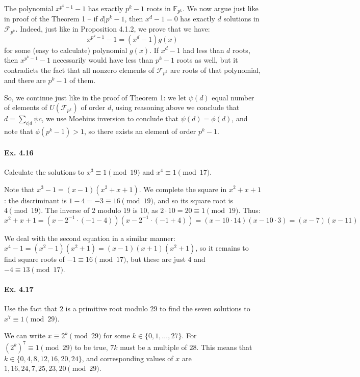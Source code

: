 \documentclass[notitlepage]{article}
\theoremstyle{definition}
\newcommand\F{\mathcal{F}}
\begin{document}
The polynomial $x^{p^k - 1} - 1$ has exactly $p^k - 1$ roots in
$\mathbb{F}_{p^k}$. We now argue just like in proof of the Theorem 1
-- if $d|p^k - 1$, then $x^d - 1 = 0$ has exactly $d$ solutions in
$\F_{p^k}$. Indeed, just like in Proposition 4.1.2, we prove that we
have:
\begin{equation}
  x^{p^k - 1} - 1 = (x^d - 1)g(x)
\end{equation}
for some (easy to calculate) polynomial $g(x)$. If $x^d - 1$ had less
than $d$ roots, then $x^{p^k - 1} - 1$ necessarily would have less
than $p^k - 1$ roots as well, but it contradicts the fact that all
nonzero elements of $\F_{p^k}$ are roots of that polynomial, and there
are $p^k - 1$ of them.

So, we continue just like in the proof of Theorem 1: we let $\psi(d)$
equal number of elements of $U(\F_{p^k})$ of order $d$, using
reasoning above we conclude that $d = \sum_{c|d} \psi{c}$, we use
Moebius inversion to conclude that $\psi(d) = \phi(d)$, and note that
$\phi(p^k - 1) > 1$, so there exists an element of order $p^k - 1$.

\paragraph{Ex. 4.16}
Calculate the solutions to $x^3 \equiv 1 \pmod {19}$ and $x^4 \equiv 1
\pmod {17}$.

Note that $x^3 - 1 = (x-1)(x^2 + x + 1)$. We complete the square in
$x^2 + x + 1$: the discriminant is $1 - 4 = -3 \equiv 16 \pmod {19}$,
and so its square root is $4 \pmod {19}$. The inverse of $2$ modulo
$19$ is $10$, as $2 \cdot 10 = 20 \equiv 1 \pmod {19}$. Thus:
\begin{equation}
x^2 + x + 1 = (x - 2^{-1}\cdot(-1 - 4))(x-2^{-1}\cdot(-1+4)) = (x-10 \cdot
14)(x-10 \cdot 3) = (x - 7)(x - 11)
\end{equation}

We deal with the second equation in a similar manner: $x^4 - 1 = (x^2
- 1)(x^2 + 1) = (x-1)(x+1)(x^2+1)$, so it remains to find square roots
of $-1 \equiv 16 \pmod {17}$, but these are just $4$ and $-4 \equiv 13
\pmod {17}$.

\paragraph{Ex. 4.17}
Use the fact that $2$ is a primitive root modulo $29$ to find the
seven solutions to $x^7 \equiv 1 \pmod {29}$.

We can write $x \equiv 2^k \pmod {29}$ for some $k \in \{0, 1, \ldots,
27\}$. For $(2^k)^7 \equiv 1 \pmod {29}$ to be true, $7k$ must be a
multiple of $28$. This means that $k \in \{0, 4, 8, 12, 16, 20, 24\}$,
and corresponding values of $x$ are $1, 16, 24, 7, 25, 23, 20 \pmod
{29}$.
\end{document}
